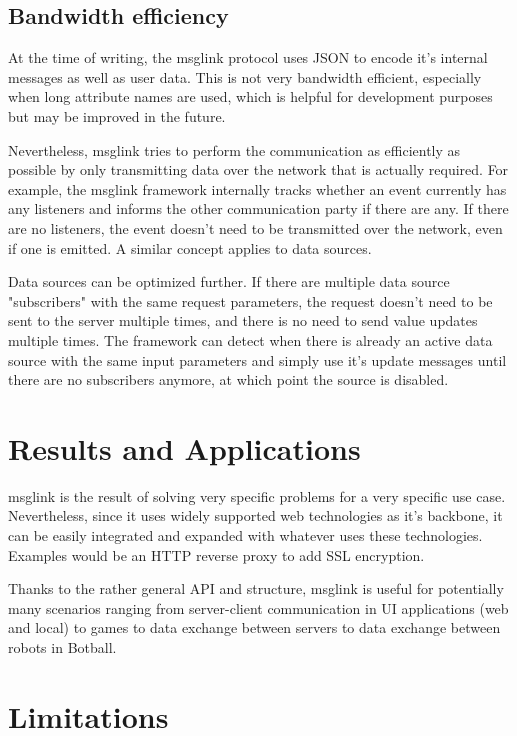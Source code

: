 \documentclass[conference]{IEEEtran}
\begin{document}
\subsection{Bandwidth efficiency}

At the time of writing, the msglink protocol uses JSON to encode it's internal messages as well as user data. This is not very bandwidth efficient, especially when long attribute names are used, which is helpful for development purposes but may be improved in the future. 

Nevertheless, msglink tries to perform the communication as efficiently as possible by only transmitting data over the network that is actually required. For example, the msglink framework internally tracks whether an event currently has any listeners and informs the other communication party if there are any. If there are no listeners, the event doesn't need to be transmitted over the network, even if one is emitted. A similar concept applies to data sources.

Data sources can be optimized further. If there are multiple data source "subscribers" with the same request parameters, the request doesn't need to be sent to the server multiple times, and there is no need to send value updates multiple times. The framework can detect when there is already an active data source with the same input parameters and simply use it's update messages until there are no subscribers anymore, at which point the source is disabled.

\section{Results and Applications}

msglink is the result of solving very specific problems for a very specific use case. Nevertheless, since it uses widely supported web technologies as it's backbone, it can be easily integrated and expanded with whatever uses these technologies. Examples would be an HTTP reverse proxy to add SSL encryption.  

Thanks to the rather general API and structure, msglink is useful for potentially many scenarios ranging from server-client communication in UI applications (web and local) to games to data exchange between servers to data exchange between robots in Botball.


\section{Limitations}
\end{document}
